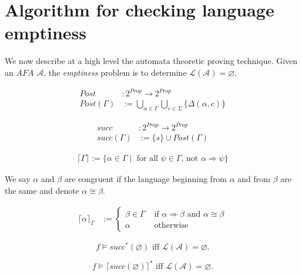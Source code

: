 \section{Algorithm for checking language emptiness}
We now describe at a high level the automata theoretic proving technique. Given
an \( \mathit{AFA}\) \( \mathcal{A} \), the \textit{emptiness} problem is to
determine \( \mathcal{L}(\mathcal{A}) = \varnothing \).

\begin{definition}
\begin{align*}
  Post         &:  2^\mathit{Prop} \rightarrow 2^\mathit{Prop} \\
  Post(\Gamma) &:= \bigcup\limits_{ \alpha \in \Gamma } \bigcup\limits_{ c \in \Sigma } \{ \Delta(\alpha, c) \}
\end{align*}

\begin{align*}
\mathit{succ}         &:  2^\mathit{Prop} \rightarrow 2^\mathit{Prop} \\ 
\mathit{succ}(\Gamma) &:= \{ s \} \cup Post(\Gamma)
\end{align*}

\begin{align*}
  \lceil \Gamma \rceil := \{ \alpha \in \Gamma \mid \text{ for all } \psi \in \Gamma \text{, not } \alpha \Rightarrow \psi \}
\end{align*}

We say \( \alpha \) and \( \beta \) are congruent if the language beginning from
\( \alpha \) and from \( \beta \) are the same and denote \( \alpha \cong
\beta\).

\begin{align*}
  \lceil \alpha \rceil _{\Gamma} &:= \left\{ \begin{array}{ll}
    \beta \in \Gamma & \text{ if } \alpha \Rightarrow \beta \text{ and } \alpha \cong \beta \\
    \alpha & \text{ otherwise }
  \end{array} \right.
\end{align*}
\end{definition}

\begin{theorem}
[Emptiness] \[ f \models \mathit{succ}^*(\varnothing) \text{ iff }
\mathcal{L}(\mathcal{A}) = \varnothing. \]
\end{theorem}

\begin{theorem}
[Antichain] \[ f \models \lceil \mathit{succ}(\varnothing) \rceil^* \text{ iff }
\mathcal{L}(\mathcal{A}) = \varnothing. \]
\end{theorem}

